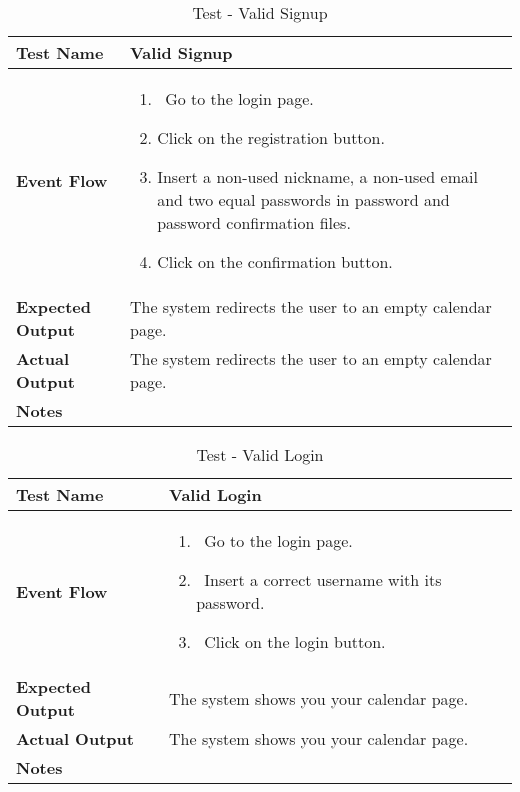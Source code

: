 \begin{table}[h]	
	\centering
	\def\arraystretch{1.5}
	\begin{tabular}{|m{7cm}|m{7cm}|}
		\hline
		\textbf{Test Name}            &  Valid Signup  \\ \hline
		\textbf{Event Flow}             &  
		\begin{enumerate}
			\item~Go to the login page.
			\item Click on the registration button.
			\item Insert a non-used nickname, a non-used email and two equal passwords in password and password confirmation files.
			\item Click on the confirmation button.
		\end{enumerate} \\ \hline
		\textbf{Expected Output}  &  The system redirects the user to an empty calendar page.   \\ \hline
		\textbf{Actual Output}       & The system redirects the user to an empty calendar page.    \\ \hline
		\textbf{Notes} & \\ \hline
	\end{tabular}
	\caption{Test - Valid Signup}
\end{table}


\begin{table}[h]	
	\centering
	\def\arraystretch{1.5}
	\begin{tabular}{|m{7cm}|m{7cm}|}
		\hline
		\textbf{Test Name}            &  Valid Login  \\ \hline
		\textbf{Event Flow}             &  
		\begin{enumerate}
			\item~Go to the login page.
			\item~Insert a correct username with its password.
			\item~Click on the login button.
		\end{enumerate}
		\\ \hline
		\textbf{Expected Output}  &  The system shows you your calendar page.   \\ \hline
		\textbf{Actual Output}       &  The system shows you your calendar page.   \\ \hline
		\textbf{Notes} & \\ \hline
	\end{tabular}
	\caption{Test - Valid Login}
\end{table}


